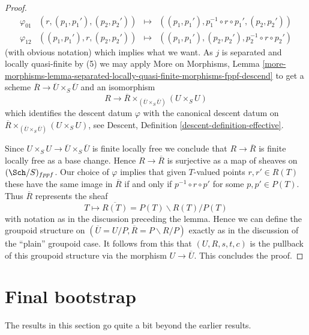\begin{proof}
$$\begin{matrix}
\varphi_{01} & (r, (p_1, p_1'), (p_2, p_2')) & \mapsto &
((p_1, p_1'), p_1^{-1} \circ r \circ p_1', (p_2, p_2')) \\
\varphi_{12} & ((p_1, p_1'), r, (p_2, p_2')) & \mapsto &
((p_1, p_1'), (p_2, p_2'), p_2^{-1} \circ r \circ p_2')
\end{matrix}
$$
(with obvious notation) which implies what we want.
As $j$ is separated and locally quasi-finite by (5) we may apply
More on Morphisms, Lemma
\ref{more-morphisms-lemma-separated-locally-quasi-finite-morphisms-fppf-descend}
to get a scheme $\overline{R} \to \overline{U} \times_S \overline{U}$
and an isomorphism
$$
R \to \overline{R} \times_{(\overline{U} \times_S \overline{U})} (U \times_S U)
$$
which identifies the descent datum $\varphi$ with the canonical
descent datum on
$\overline{R} \times_{(\overline{U} \times_S \overline{U})} (U \times_S U)$,
see
Descent, Definition \ref{descent-definition-effective}.

\medskip\noindent
Since $U \times_S U \to \overline{U} \times_S \overline{U}$ is finite
locally free we conclude that $R \to \overline{R}$ is finite locally free
as a base change. Hence $R \to \overline{R}$ is surjective as a map of
sheaves on $(\Sch/S)_{fppf}$.
Our choice of $\varphi$ implies that given $T$-valued points $r, r' \in R(T)$
these have the same image in $\overline{R}$ if and only if
$p^{-1} \circ r \circ p'$ for some $p, p' \in P(T)$. Thus
$\overline{R}$ represents the sheaf
$$
T \longmapsto  \overline{R(T)} = P(T)\backslash R(T)/P(T)
$$
with notation as in the discussion preceding the lemma.
Hence we can define the groupoid structure on
$(\overline{U} = U/P, \overline{R} = P\backslash R/P)$ exactly as in
the discussion of the ``plain'' groupoid case.
It follows from this that $(U, R, s, t, c)$ is the pullback of
this groupoid structure via the morphism $U \to \overline{U}$.
This concludes the proof.
\end{proof}















\section{Final bootstrap}
\label{section-final-bootstrap}

\noindent
The results in this section go quite a bit beyond the earlier results.

